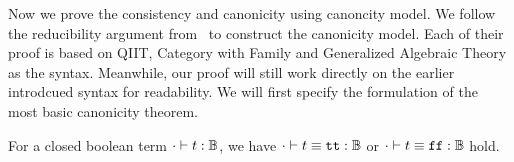 Now we prove the consistency and canonicity using canoncity model. We follow the reducibility argument from~\cite{kaposi2019gluing, coquand2018canonicity,sterling2019algebraic} to construct the canonicity model.
Each of their proof is based on QIIT, Category with Family\cite{dybjer1995internal} and Generalized Algebraic Theory \cite{cartmell1986generalised} as the syntax. Meanwhile, our proof will still work directly on the earlier introdcued syntax for readability.
We will first specify the formulation of the most basic canonicity theorem. 

\begin{theorem}[Canonicity]
  For a closed boolean term $ {\cdot} \vdash {t} : {\mathbb{B}} $, we have $ {\cdot} \vdash {t \equiv \ensuremath{\texttt{tt}}} : {\mathbb{B}} $ or $ {\cdot} \vdash {t \equiv \ensuremath{\texttt{ff}}} : {\mathbb{B}} $ hold.
\end{theorem}

